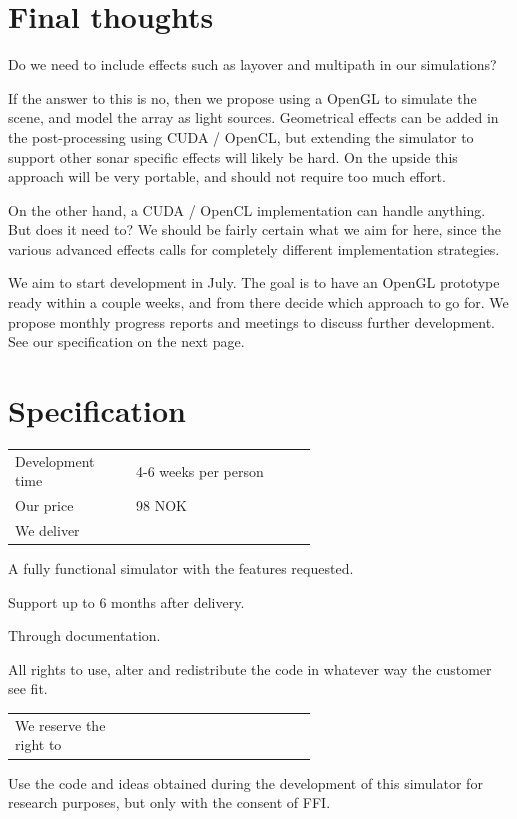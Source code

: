 \documentclass[
   article                                      %
 , 12pt                                         %
 , xelatex                                      %
 , bibtex                                       %
 , layout
]{common/mytemplate}
\begin{document}
\section{Final thoughts}

Do we need to include effects such as layover and multipath in our simulations?

If the answer to this is no, then we propose using a OpenGL to simulate the scene, and model the array as light sources. Geometrical effects can be added in the post-processing using CUDA / OpenCL, but extending the simulator to support other sonar specific effects will likely be hard. On the upside this approach will be very portable, and should not require too much effort.

On the other hand, a CUDA / OpenCL implementation can handle anything. But does it need to? We should be fairly certain what we aim for here, since the various advanced effects calls for completely different implementation strategies.

We aim to start development in July. The goal is to have an OpenGL prototype ready within a couple weeks, and from there decide which approach to go for. We propose monthly progress reports and meetings to discuss further development. See our specification on the next page.

\newpage

\section{Specification}


\begin{tabular}[c]{l p{0.6\linewidth}}
Development time       & 4-6 weeks per person  \\
Our price              & 98\;000 NOK \\
We deliver        & 
\end{tabular}
\begin{itemize0}
\item A fully functional simulator with the features requested.
\item Support up to 6 months after delivery.
\item Through documentation.
\item All rights to use, alter and redistribute the code in whatever way the customer see fit.
\end{itemize0}
\begin{tabular}[c]{l p{0.6\linewidth}}
We reserve the right to &
\end{tabular}
\begin{itemize0}
\item Use the code and ideas obtained during the development of this simulator for research purposes, but only with the consent of FFI.
\end{itemize0}
\end{document}
